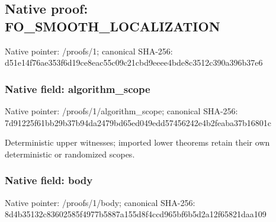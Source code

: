 \documentclass[10pt,a4paper]{article}
\begin{document}
\subsection{Native proof: FO\_\allowbreak{}SMOOTH\_\allowbreak{}LOCALIZATION}
Native pointer: /proofs/1; canonical SHA-256: d51e14f76ae353f6d19ce8eac55c09c21cbd9eeee4bde8c3512c390a396b37e6

\subsubsection{Native field: algorithm\_\allowbreak{}scope}
Native pointer: /proofs/1/algorithm\_\allowbreak{}scope; canonical SHA-256: 7d91225f61bb29b37b94da2479bd65ed049edd57456242e4b2feaba37b16801c

\begingroup\raggedright\sloppy Deterministic upper witnesses;\allowbreak{} imported lower theorems retain their own deterministic or randomized scopes.\par\endgroup

\subsubsection{Native field: body}
Native pointer: /proofs/1/body; canonical SHA-256: 8d4b35132c83602585f4977b5887a155d8f4ccd965bf6b5d2a12f65821daa109
\end{document}
